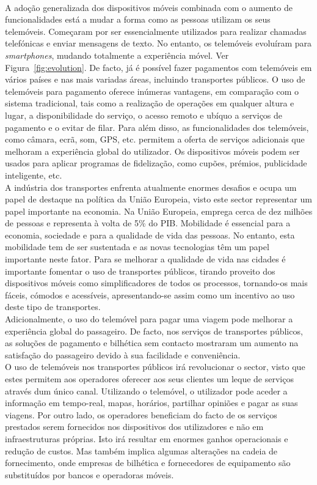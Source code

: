 ~\\A adoção generalizada dos dispositivos móveis combinada com o aumento de funcionalidades está a mudar a forma como as pessoas utilizam os seus telemóveis. Começaram por ser essencialmente utilizados para realizar chamadas telefónicas e enviar mensagens de texto. No entanto, os telemóveis evoluíram para \emph{smartphones}, mudando totalmente a experiência móvel. Ver Figura~\ref{fig:evolution}. De facto, já é possível fazer pagamentos com telemóveis em vários países e nas mais variadas áreas, incluindo transportes públicos. O uso de telemóveis para pagamento oferece inúmeras vantagens, em comparação com o sistema tradicional, tais como a realização de operações em qualquer altura e lugar, a disponibilidade do serviço, o acesso remoto e ubíquo a serviços de pagamento e o evitar de filar. Para além disso, as funcionalidades dos telemóveis, como câmara, ecrã, som, GPS, etc. permitem a oferta de serviços adicionais que melhoram a experiência global do utilizador. Os dispositivos móveis podem ser usados para aplicar programas de fidelização, como cupões, prémios, publicidade inteligente, etc. \cite{Ferreira2013}
\\A indústria dos transportes enfrenta atualmente enormes desafios e ocupa um papel de destaque na política da União Europeia, visto este sector representar um papel importante na economia. Na União Europeia, emprega cerca de dez milhões de pessoas e representa à volta de 5\% do PIB. \cite{eurocomiss} Mobilidade é essencial para a economia, sociedade e para a qualidade de vida das pessoas. No entanto, esta mobilidade tem de ser sustentada e as novas tecnologias têm um papel importante neste fator. Para se melhorar a qualidade de vida nas cidades é importante fomentar o uso de transportes públicos, tirando proveito dos dispositivos móveis como simplificadores de todos os processos, tornando-os mais fáceis, cómodos e acessíveis, apresentando-se assim como um incentivo ao uso deste tipo de transportes. \cite{Ferreira2013}
\\Adicionalmente, o uso do telemóvel para pagar uma viagem pode melhorar a experiência global do passageiro. De facto, nos serviços de transportes públicos, as soluções de pagamento e bilhética sem contacto mostraram um aumento na satisfação do passageiro devido à sua facilidade e conveniência. \cite{NFCForum2011}
\\O uso de telemóveis nos transportes públicos irá revolucionar o sector, visto que estes permitem aos operadores oferecer aos seus clientes um leque de serviços através dum único canal. Utilizando o telemóvel, o utilizador pode aceder a informação em tempo-real, mapas, horários, partilhar opiniões e pagar as suas viagens. Por outro lado, os operadores beneficiam do facto de os serviços prestados serem fornecidos nos dispositivos dos utilizadores e não em infraestruturas próprias. Isto irá resultar em enormes ganhos operacionais e redução de custos. Mas também implica algumas alterações na cadeia de fornecimento, onde empresas de bilhética e fornecedores de equipamento são substituídos por bancos e operadoras móveis. \cite{Ferreira2013}

